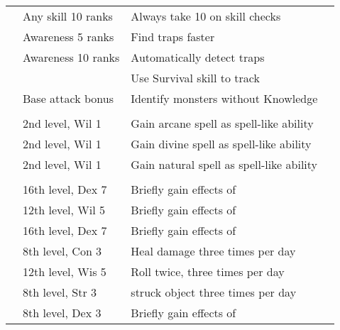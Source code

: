{\begin{longtabu}{>{\lcol}p{10em} >{\lcol}p{15em} >{\lcol}X >{\lcol}p{3em}}
         & Any skill 10 ranks & Always take 10 on skill checks &  \\
         & Awareness 5 ranks & Find traps faster &  \\
         & Awareness 10 ranks & Automatically detect traps &  \\
         & \x &  Use Survival skill to track &  \\
         & Base attack bonus  & Identify monsters without Knowledge &  \\

        \midrule
         &  &  &  \\
         & 2nd level, Wil 1 & Gain arcane spell as spell-like ability &  \\
         & 2nd level, Wil 1 & Gain divine spell as spell-like ability &  \\
         & 2nd level, Wil 1 & Gain natural spell as spell-like ability &  \\

        \midrule
         &  &  &  \\
         & 16th level, Dex 7 & Briefly gain effects of  &  \\
         & 12th level, Wil 5 & Briefly gain effects of  &  \\
         & 16th level, Dex 7 & Briefly gain effects of  &  \\
         & 8th level, Con 3 & Heal damage three times per day &  \\
         & 12th level, Wis 5 & Roll twice, three times per day &  \\
         & 8th level, Str 3 & 
        struck object three times per day &  \\
         & 8th level, Dex 3 & Briefly gain effects of  &  \\
    \end{longtabu}
}%

